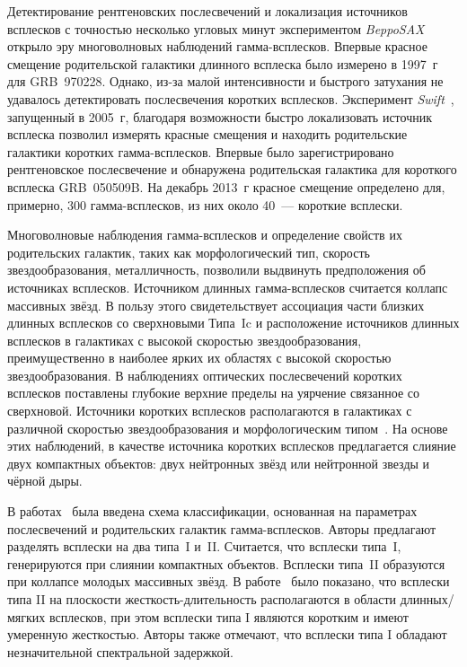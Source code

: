 Детектирование рентгеновских послесвечений и локализация источников всплесков с 
точностью несколько угловых минут экспериментом \textit{BeppoSAX}~\citep{Boella1997} 
открыло эру многоволновых наблюдений гамма-всплесков. Впервые красное смещение 
родительской галактики длинного всплеска было измерено в 1997~г для GRB~970228. 
Однако, из-за малой интенсивности и быстрого затухания не удавалось детектировать 
послесвечения коротких всплесков. Эксперимент \textit{Swift}~\citep{Gehrels_2004}, 
запущенный в 2005~г, благодаря возможности быстро локализовать источник всплеска 
позволил измерять красные смещения и находить родительские галактики коротких 
гамма-всплесков. Впервые было зарегистрировано рентгеновское послесвечение и обнаружена 
родительская галактика для короткого всплеска GRB~050509B. На декабрь 2013~г красное 
смещение определено для, примерно, 300 гамма-всплесков, из них около 40~--- короткие всплески.

Многоволновые наблюдения гамма-всплесков и определение свойств их родительских галактик, 
таких как морфологический тип, скорость звездообразования, металличность, позволили 
выдвинуть предположения об источниках всплесков. Источником длинных гамма-всплесков 
считается коллапс массивных звёзд. В пользу этого свидетельствует ассоциация части 
близких длинных всплесков со сверхновыми Типа~Ic и расположение источников длинных 
всплесков в галактиках с высокой скоростью звездообразования, преимущественно в 
наиболее ярких их областях с высокой скоростью звездообразования. В наблюдениях 
оптических послесвечений коротких всплесков поставлены глубокие верхние пределы 
на уярчение связанное со сверхновой. Источники коротких всплесков располагаются 
в галактиках с различной скоростью звездообразования и морфологическим 
типом~\citep[см. обзор][]{Berger_2014}. На основе этих наблюдений, в качестве 
источника коротких всплесков предлагается слияние двух компактных объектов: 
двух нейтронных звёзд или нейтронной звезды и чёрной дыры.

В работах~\citep{Zhang_2006, Zhang_2007, Zhang_2009} была введена схема классификации, 
основанная на параметрах послесвечений и родительских галактик гамма-всплесков. 
Авторы предлагают разделять всплески на два типа~I и~II. Считается, что всплески 
типа~I, генерируются при слиянии компактных объектов. Всплески типа~II образуются 
при коллапсе молодых массивных звёзд. В работе~\citep{Zhang_2009} было показано, 
что всплески типа II на плоскости жесткость-длительность располагаются в области 
длинных/мягких всплесков, при этом всплески типа I являются коротким и имеют 
умеренную жесткостью. Авторы также отмечают, что всплески типа I обладают 
незначительной спектральной задержкой.

